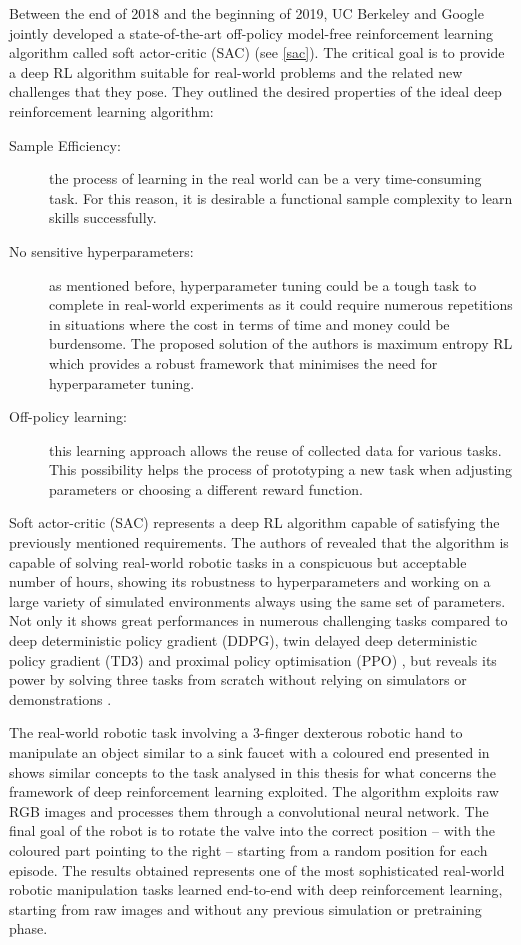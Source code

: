 Between the end of 2018 and the beginning of 2019, UC Berkeley and Google jointly developed a state-of-the-art off-policy model-free reinforcement learning algorithm called soft actor-critic (SAC) (see \vref{sac}).
The critical goal is to provide a deep RL algorithm suitable for real-world problems and the related new challenges that they pose.
They outlined the desired properties of the ideal deep reinforcement learning algorithm:
\begin{description}
	\item[Sample Efficiency:] the process of learning in the real world can be a very time-consuming task.
	      For this reason, it is desirable a functional sample complexity to learn skills successfully.
	\item[No sensitive hyperparameters:] as mentioned before, hyperparameter tuning could be a tough task to complete in real-world experiments as it could require numerous repetitions in situations where the cost in terms of time and money could be burdensome.
	      The proposed solution of the authors is maximum entropy RL which provides a robust framework that minimises the need for hyperparameter tuning.
	\item[Off-policy learning:] this learning approach allows the reuse of collected data for various tasks.
	      This possibility helps the process of prototyping a new task when adjusting parameters or choosing a different reward function.
\end{description}

Soft actor-critic (SAC) represents a deep RL algorithm capable of satisfying the previously mentioned requirements.
The authors of \cite{haarnoja2018soft,haarnoja2018alg} revealed that the algorithm is capable of solving real-world robotic tasks in a conspicuous but acceptable number of hours, showing its robustness to hyperparameters and working on a large variety of simulated environments always using the same set of parameters.
Not only it shows great performances in numerous challenging tasks compared to deep deterministic policy gradient (DDPG), twin delayed deep deterministic policy gradient (TD3) \cite{fujimoto2018addressing} and proximal policy optimisation (PPO) \cite{schulman2017proximal}, but reveals its power by solving three tasks from scratch without relying on simulators or demonstrations \cite{bair2019soft}.

The real-world robotic task involving a 3-finger dexterous robotic hand to manipulate an object similar to a sink faucet with a coloured end presented in \cite[Section 7.3]{haarnoja2018alg} shows similar concepts to the task analysed in this thesis for what concerns the framework of deep reinforcement learning exploited.
The algorithm exploits raw RGB images and processes them through a convolutional neural network.
The final goal of the robot is to rotate the valve into the correct position -- with the coloured part pointing to the right -- starting from a random position for each episode.
The results obtained represents one of the most sophisticated real-world robotic manipulation tasks learned end-to-end with deep reinforcement learning, starting from raw images and without any previous simulation or pretraining phase.

